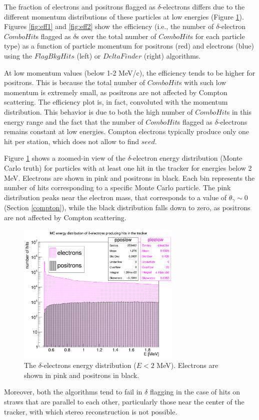 The fraction of electrons and positrons 
flagged as $\delta$-electrons 
differs due to the different momentum distributions  
of these particles at low energies 
(Figure \ref{fig:detail}). Figures \ref{fig:eff1} and 
\ref{fig:eff2} 
show the efficiency 
(i.e., the number of $\delta$-electron 
$ComboHit$s flagged as $\delta$s 
over the total number of $ComboHit$s 
for each particle type) as a function 
of particle momentum for positrons (red) 
and electrons (blue) using the 
$FlagBkgHits$ (left) or $DeltaFinder$ 
(right) algorithms. 

At low momentum values (below 1-2 MeV/c), 
the efficiency 
tends to be higher for positrons. 
This is because the 
total number of $ComboHit$s with 
such low momentum is extremely 
small, as positrons are not affected 
by Compton scattering. 
The efficiency plot is, in fact, 
convoluted with the momentum 
distribution. This behavior is due 
to both the high number of 
$ComboHit$s in this energy range and 
the fact that the number 
of $ComboHit$s flagged as 
$\delta$-electrons remains constant 
at low energies. Compton electrons 
typically produce only 
one hit per station, which does not allow to 
find $seed$. 

Figure \ref{fig:detail} shows a zoomed-in view of the 
$\delta$-electron energy 
distribution (Monte Carlo truth) for particles with  
at least one hit in the 
tracker for energies below 
2 MeV. Electrons are shown in 
pink and positrons in black. 
Each bin represents the number 
of hits corresponding to a 
specific Monte Carlo particle. 
The pink distribution peaks 
near the electron mass, that 
corresponds to a value of $\theta_\gamma \sim 0$ (Section \ref{compton}), 
while the black distribution falls down 
to zero, as positrons are not 
affected by Compton scattering.


\begin{figure}[!h]
    \centering
    \includegraphics[width =0.7\textwidth]{figures/png/Screenshot_20240820_154854.png}
    \caption[The $\delta$-electrons energy distribution.]{The $\delta$-electrons energy distribution ($E<2$ MeV). Electrons 
    are shown in pink and positrons in black.}
    \label{fig:detail}
\end{figure}
Moreover, both the algorithms tend to fail 
in $\delta$ flagging in the case of  
hits on straws that are 
parallel to each other, particularly 
those near the center of the tracker, 
with which stereo reconstruction is not possible. 

